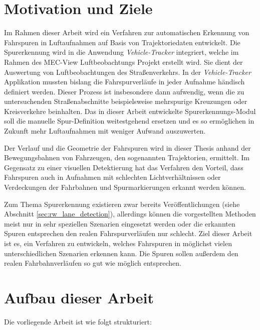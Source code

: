 \section{Motivation und Ziele}
\label{sec:motivation_goals}

Im Rahmen dieser Arbeit wird ein Verfahren zur automatischen Erkennung von Fahrspuren in Luftaufnahmen
auf Basis von Trajektoriedaten entwickelt. Die Spurerkennung wird in die Anwendung \textit{Vehicle-Tracker}
integriert, welche im Rahmen des MEC-View Luftbeobachtungs Projekt erstellt wird. Sie dient der Auswertung
von Luftbeobachtungen des Straßenverkehrs.
In der \textit{Vehicle-Tracker} Applikation mussten bislang die Fahrspurverläufe in jeder Aufnahme
händisch definiert werden. Dieser Prozess ist insbesondere dann aufwendig, wenn die zu untersuchenden
Straßenabschnitte beispielsweise mehrspurige Kreuzungen oder Kreisverkehre beinhalten. Das in dieser Arbeit
entwickelte Spurerkennungs-Modul soll die manuelle Spur-Definition weitestgehend ersetzen und es so ermöglichen
in Zukunft mehr Luftaufnahmen mit weniger Aufwand auszuwerten.

Der Verlauf und die Geometrie der Fahrspuren wird in dieser Thesis anhand der Bewegungsbahnen von Fahrzeugen, den sogenannten Trajektorien,
ermittelt. Im Gegensatz zu einer visuellen Detektierung hat das Verfahren den Vorteil, dass Fahrspuren auch in Aufnahmen
mit schlechten Lichtverhältnissen oder Verdeckungen der Fahrbahnen und Spurmarkierungen erkannt werden können.

Zum Thema Spurerkennung existieren zwar bereits Veröffentlichungen (siehe Abschnitt \ref{sec:rw_lane_detection}),
allerdings können die
vorgestellten Methoden meist nur in sehr speziellen Szenarien eingesetzt werden oder die erkannten Spuren
entsprechen den realen Fahrspurverläufen nur schlecht. Ziel dieser Arbeit ist es, ein Verfahren zu entwickeln,
welches Fahrspuren in möglichst vielen unterschiedlichen Szenarien erkennen kann.
Die Spuren sollen außerdem den realen Fahrbahnverläufen so gut wie möglich entsprechen.

\section{Aufbau dieser Arbeit}
\label{sec:aufbau}

Die vorliegende Arbeit ist wie folgt strukturiert:

